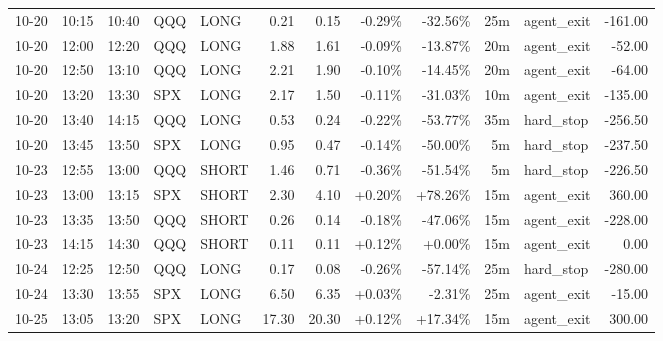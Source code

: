 \documentclass[11pt,a4paper]{article}
\begin{document}
\begin{center}
\begin{longtable}{>{\color{txtmain}}l l l l l r r r r r >{\color{txtmain}}l r}
10-20 & 10:15 & 10:40 & QQQ & LONG & 0.21 & 0.15 & \textcolor{lossred}{-0.29\%} & \textcolor{lossred}{-32.56\%} & 25m & agent\_exit & \textcolor{lossred}{-161.00} \\
10-20 & 12:00 & 12:20 & QQQ & LONG & 1.88 & 1.61 & \textcolor{lossred}{-0.09\%} & \textcolor{lossred}{-13.87\%} & 20m & agent\_exit & \textcolor{lossred}{-52.00} \\
10-20 & 12:50 & 13:10 & QQQ & LONG & 2.21 & 1.90 & \textcolor{lossred}{-0.10\%} & \textcolor{lossred}{-14.45\%} & 20m & agent\_exit & \textcolor{lossred}{-64.00} \\
10-20 & 13:20 & 13:30 & SPX & LONG & 2.17 & 1.50 & \textcolor{lossred}{-0.11\%} & \textcolor{lossred}{-31.03\%} & 10m & agent\_exit & \textcolor{lossred}{-135.00} \\
10-20 & 13:40 & 14:15 & QQQ & LONG & 0.53 & 0.24 & \textcolor{lossred}{-0.22\%} & \textcolor{lossred}{-53.77\%} & 35m & hard\_stop & \textcolor{lossred}{-256.50} \\
10-20 & 13:45 & 13:50 & SPX & LONG & 0.95 & 0.47 & \textcolor{lossred}{-0.14\%} & \textcolor{lossred}{-50.00\%} & 5m & hard\_stop & \textcolor{lossred}{-237.50} \\
10-23 & 12:55 & 13:00 & QQQ & SHORT & 1.46 & 0.71 & \textcolor{lossred}{-0.36\%} & \textcolor{lossred}{-51.54\%} & 5m & hard\_stop & \textcolor{lossred}{-226.50} \\
10-23 & 13:00 & 13:15 & SPX & SHORT & 2.30 & 4.10 & \textcolor{wingreen}{+0.20\%} & \textcolor{wingreen}{+78.26\%} & 15m & agent\_exit & \textcolor{wingreen}{360.00} \\
10-23 & 13:35 & 13:50 & QQQ & SHORT & 0.26 & 0.14 & \textcolor{lossred}{-0.18\%} & \textcolor{lossred}{-47.06\%} & 15m & agent\_exit & \textcolor{lossred}{-228.00} \\
10-23 & 14:15 & 14:30 & QQQ & SHORT & 0.11 & 0.11 & \textcolor{wingreen}{+0.12\%} & \textcolor{wingreen}{+0.00\%} & 15m & agent\_exit & \textcolor{wingreen}{0.00} \\
10-24 & 12:25 & 12:50 & QQQ & LONG & 0.17 & 0.08 & \textcolor{lossred}{-0.26\%} & \textcolor{lossred}{-57.14\%} & 25m & hard\_stop & \textcolor{lossred}{-280.00} \\
10-24 & 13:30 & 13:55 & SPX & LONG & 6.50 & 6.35 & \textcolor{wingreen}{+0.03\%} & \textcolor{lossred}{-2.31\%} & 25m & agent\_exit & \textcolor{lossred}{-15.00} \\
10-25 & 13:05 & 13:20 & SPX & LONG & 17.30 & 20.30 & \textcolor{wingreen}{+0.12\%} & \textcolor{wingreen}{+17.34\%} & 15m & agent\_exit & \textcolor{wingreen}{300.00} \\

\end{longtable}
\end{center}
\end{document}
